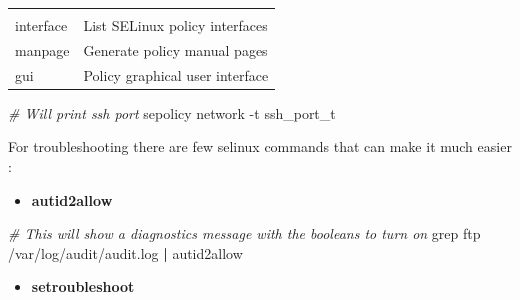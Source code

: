 \documentclass[
  14pt,
  english,
  a4paper,
]{scrreprt}
\newenvironment{Shaded}{}{}
\newcommand{\CommentTok}[1]{\textcolor[rgb]{0.38,0.63,0.69}{\textit{#1}}}
\newcommand{\ExtensionTok}[1]{#1}
\newcommand{\FunctionTok}[1]{\textcolor[rgb]{0.02,0.16,0.49}{#1}}
\newcommand{\KeywordTok}[1]{\textcolor[rgb]{0.00,0.44,0.13}{\textbf{#1}}}
\newcommand{\NormalTok}[1]{#1}
\providecommand{\tightlist}{%
  \setlength{\itemsep}{0pt}\setlength{\parskip}{0pt}}
\begin{document}
\begin{longtable}[]{@{}ll@{}}
\begin{minipage}[t]{0.50\columnwidth}
\end{minipage}\tabularnewline
\begin{minipage}[t]{0.18\columnwidth}\raggedright
interface\strut
\end{minipage} & \begin{minipage}[t]{0.50\columnwidth}\raggedright
List SELinux policy interfaces\strut
\end{minipage}\tabularnewline
\begin{minipage}[t]{0.18\columnwidth}\raggedright
manpage\strut
\end{minipage} & \begin{minipage}[t]{0.50\columnwidth}\raggedright
Generate policy manual pages\strut
\end{minipage}\tabularnewline
\begin{minipage}[t]{0.18\columnwidth}\raggedright
gui\strut
\end{minipage} & \begin{minipage}[t]{0.50\columnwidth}\raggedright
Policy graphical user interface\strut
\end{minipage}\tabularnewline
\bottomrule
\end{longtable}

\begin{Shaded}
\begin{Highlighting}[]
\CommentTok{\# Will print ssh port}
\ExtensionTok{sepolicy}\NormalTok{ network {-}t ssh\_port\_t}
\end{Highlighting}
\end{Shaded}

For troubleshooting there are few selinux commands that can make it much
easier :

\begin{itemize}
\tightlist
\item
  \textbf{autid2allow}
\end{itemize}

\begin{Shaded}
\begin{Highlighting}[]
\CommentTok{\# This will show a diagnostics message with the booleans to turn on}
\FunctionTok{grep}\NormalTok{ ftp /var/log/audit/audit.log }\KeywordTok{|} \ExtensionTok{autid2allow}
\end{Highlighting}
\end{Shaded}

\begin{itemize}
\tightlist
\item
  \textbf{setroubleshoot}
\end{itemize}
\end{document}
